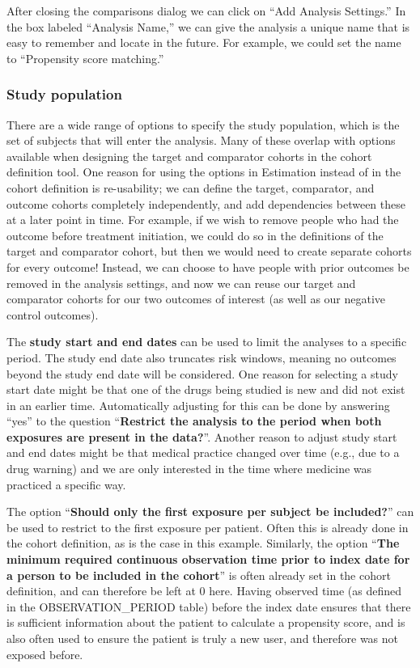 \documentclass[11pt]{book}
\theoremstyle{definition}
\theoremstyle{definition}
\theoremstyle{definition}
\theoremstyle{remark}
\begin{document}
After closing the comparisons dialog we can click on ``Add Analysis Settings.'' In the box labeled ``Analysis Name,'' we can give the analysis a unique name that is easy to remember and locate in the future. For example, we could set the name to ``Propensity score matching.''

\hypertarget{study-population}{%
\subsubsection*{Study population}\label{study-population}}

There are a wide range of options to specify the study population, which is the set of subjects that will enter the analysis. Many of these overlap with options available when designing the target and comparator cohorts in the cohort definition tool. One reason for using the options in Estimation instead of in the cohort definition is re-usability; we can define the target, comparator, and outcome cohorts completely independently, and add dependencies between these at a later point in time. For example, if we wish to remove people who had the outcome before treatment initiation, we could do so in the definitions of the target and comparator cohort, but then we would need to create separate cohorts for every outcome! Instead, we can choose to have people with prior outcomes be removed in the analysis settings, and now we can reuse our target and comparator cohorts for our two outcomes of interest (as well as our negative control outcomes).

The \textbf{study start and end dates} can be used to limit the analyses to a specific period. The study end date also truncates risk windows, meaning no outcomes beyond the study end date will be considered. One reason for selecting a study start date might be that one of the drugs being studied is new and did not exist in an earlier time. Automatically adjusting for this can be done by answering ``yes'' to the question ``\textbf{Restrict the analysis to the period when both exposures are present in the data?}''. Another reason to adjust study start and end dates might be that medical practice changed over time (e.g., due to a drug warning) and we are only interested in the time where medicine was practiced a specific way.

The option ``\textbf{Should only the first exposure per subject be included?}'' can be used to restrict to the first exposure per patient. Often this is already done in the cohort definition, as is the case in this example. Similarly, the option ``\textbf{The minimum required continuous observation time prior to index date for a person to be included in the cohort}'' is often already set in the cohort definition, and can therefore be left at 0 here. Having observed time (as defined in the OBSERVATION\_PERIOD table) before the index date ensures that there is sufficient information about the patient to calculate a propensity score, and is also often used to ensure the patient is truly a new user, and therefore was not exposed before.
\end{document}
